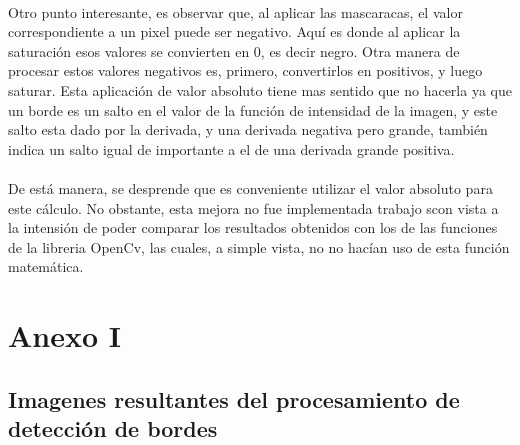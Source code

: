 \documentclass[11pt, a4paper]{article}
\begin{document}
\paragraph{}
Otro punto interesante, es observar que, al aplicar las mascaracas, el valor correspondiente a un pixel puede ser negativo. Aqu\'i es donde al aplicar la saturaci\'on esos valores se convierten en 0, es decir negro. Otra manera de procesar estos valores negativos es, primero, convertirlos en positivos, y luego saturar. Esta aplicaci\'on de valor absoluto tiene mas sentido que no hacerla ya que un borde es un salto en el valor de la funci\'on de intensidad de la imagen, y este salto esta dado por la derivada, y una derivada negativa pero grande, tambi\'en indica un salto igual de importante a el de una derivada grande positiva.

\paragraph{}
De est\'a manera, se desprende que es conveniente utilizar el valor absoluto para este c\'alculo. No obstante, esta mejora no fue implementada trabajo scon vista a la intensi\'on de poder comparar los resultados obtenidos con los de las funciones de la libreria OpenCv, las cuales, a simple vista, no no hac\'ian uso de esta funci\'on matem\'atica.


\newpage
\section{Anexo I}
\subsection{Imagenes resultantes del procesamiento de detecci\'on de bordes}

\vspace{2cm}
\end{document}
